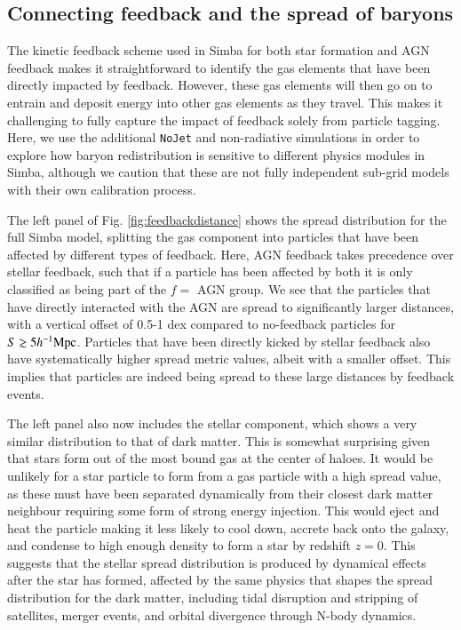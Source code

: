 \documentclass[fleqn,usenatbib]{mnras}
\newcommand{\hmpc}{h^{-1}{\rm Mpc}}
\newcommand{\simba}{{\sc Simba}}
\newcommand{\nojet}{{\tt NoJet}}
\begin{document}
\subsection{Connecting feedback and the spread of baryons}
\label{sec:fullmodelfeedback}

The kinetic feedback scheme used in \simba{} for both star formation and AGN
feedback makes it straightforward to identify the gas elements that have been
directly impacted by feedback. However, these gas elements will then go on to
entrain and deposit energy into other gas elements as they travel. This makes
it challenging to fully capture the impact of feedback solely from particle
tagging. Here, we use the additional \nojet{} and non-radiative simulations
in order to explore how baryon redistribution is sensitive to different
physics modules in \simba{}, although we caution that these are not fully
independent sub-grid models with their own calibration process.




The left panel of Fig. \ref{fig:feedbackdistance} shows the spread distribution
for the full \simba{} model, splitting the gas component into particles that
have been affected by different types of feedback. Here, AGN feedback takes
precedence over stellar feedback, such that if a particle has been affected
by both it is only classified as being part of the $f=$ AGN group. We see that
the particles that have directly interacted with the AGN are spread to
significantly larger distances, with a vertical offset of 0.5-1 dex compared
to no-feedback particles for $S \gtrsim 5\hmpc{}$. Particles that have been
directly kicked by stellar feedback also have systematically higher spread
metric values, albeit with a smaller offset. This implies that particles are
indeed being spread to these large distances by feedback events.

The left panel also now includes the stellar component, which shows a very
similar distribution to that of dark matter. This is somewhat surprising
given that stars form out of the most bound gas at the center of haloes. It
would be unlikely for a star particle to form from a gas particle with a high
spread value, as these must have been separated dynamically from their
closest dark matter neighbour requiring some form of strong energy injection.
This would eject and heat the particle making it less likely to cool down,
accrete back onto the galaxy, and condense to high enough density to form a
star by redshift $z = 0$. This suggests that the stellar spread distribution
is produced by dynamical effects after the star has formed, affected by the
same physics that shapes the spread distribution for the dark matter,
including tidal disruption and stripping of satellites, merger events, and
orbital divergence through N-body dynamics.
\end{document}
